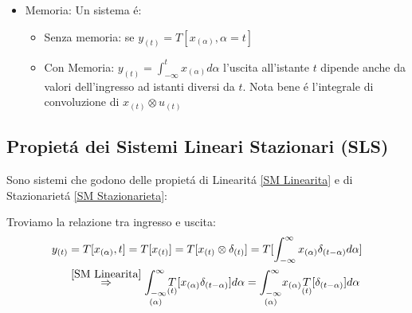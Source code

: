 \begin{itemize}
            \item {Memoria:
                Un sistema é:
                \begin{itemize}
                    \item {Senza memoria: se $y_{(t)} = T[x_{(\alpha)},\alpha=t]$}
                    \item {Con Memoria: $y_{(t)} =\int_{-\infty}^{t}x_{(\alpha)} d\alpha$ l'uscita all'istante $t$ dipende anche da valori dell'ingresso 
                          ad istanti diversi da $t$. Nota bene é l'integrale di convoluzione di $x_{(t)} \otimes u_{(t)}$ 
                    }
                \end{itemize}
            }\label{SM Memoria}
        \end{itemize}
    \subsection{Propietá dei Sistemi Lineari Stazionari (SLS)}
        Sono sistemi che godono delle propietá di Linearitá \ref{SM Linearita} e di Stazionarietá \ref*{SM Stazionarieta}:
        \begin{figure}[H]
            \centering 
        \label{Def SLS}
        \end{figure}  
        Troviamo la relazione tra ingresso e uscita:
        \begin{align}
            y_{(t)} &= T[x_{(\alpha)},t] =T[x_{(t)}] = T[x_{(t)} \otimes \delta_{(t)}] = T[\int_{-\infty}^{\infty}x_{(\alpha)}\delta_{(t-\alpha)}d\alpha]\nonumber \\        
                    &\overset{\ref*{SM Linearita}}{\Rightarrow} \underset{(\alpha)}{\int_{-\infty}^{\infty}}\underset{(t)}{T}[x_{(\alpha)}\delta_{(t-\alpha)}]d\alpha =\underset{(\alpha)}{\int_{-\infty}^{\infty}}x_{(\alpha)}\underset{(t)}{T}[\delta_{(t-\alpha)}]d\alpha\nonumber         
        \end{align}  
